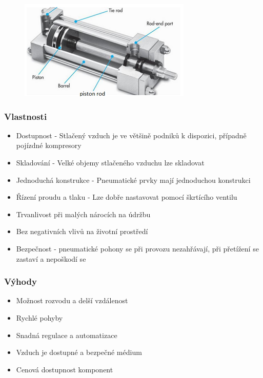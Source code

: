 \begin{figure}[h]
    \begin{center}
        \includegraphics[scale = 1]{img/Picture10.png}
    \end{center}
\end{figure}

\subsubsection*{Vlastnosti}
\begin{itemize}
    \item Dostupnost - Stlačený vzduch je ve většině podniků k dispozici, případně pojízdné kompresory
    \item Skladování - Velké objemy stlačeného vzduchu lze skladovat
    \item Jednoduchá konstrukce - Pneumatické prvky mají jednoduchou konstrukci
    \item Řízení proudu a tlaku - Lze dobře nastavovat pomocí škrtícího ventilu
    \item Trvanlivost při malých nárocích na údržbu
    \item Bez negativních vlivů na životní prostředí
    \item Bezpečnost - pneumatické pohony se při provozu nezahřávají, při přetížení se zastaví a nepoškodí se
\end{itemize}

\subsubsection*{Výhody}
\begin{itemize}
    \item Možnost rozvodu a delší vzdálenost
    \item Rychlé pohyby
    \item Snadná regulace a automatizace
    \item Vzduch je dostupné a bezpečné médium
    \item Cenová dostupnost komponent
\end{itemize}

